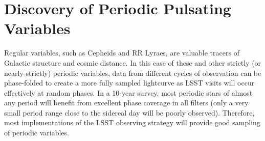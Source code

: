 
%
%
%
%
%
%

\section{Discovery of Periodic Pulsating Variables}
\def\secname{periodicvariables}\label{sec:\secname}



Regular variables, such as Cepheids and RR Lyraes, are valuable tracers of Galactic structure and cosmic distance. In this case of these and other strictly (or nearly-strictly) periodic variables, data from different cycles of observation can be phase-folded to create a more fully sampled lightcurve as LSST visits will occur effectively at random phases. In a 10-year survey, most periodic stars of almost any period will benefit from excellent phase coverage in all filters (only a very small period range close to the sidereal day will be poorly observed). Therefore, most implementations of the LSST observing strategy will provide good sampling of periodic variables.


